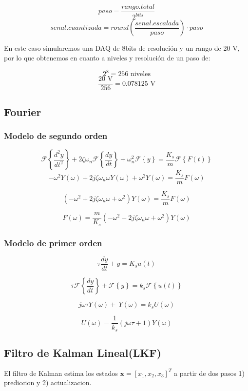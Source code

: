 \documentclass[conference]{IEEEtran}
\begin{document}
\[
paso = \frac{rango.total}{2^{bits}}
\]
\[
senal.cuantizada = round(\frac{senal.escalada}{paso})\cdot paso
\]

En este caso simularemos una DAQ de 8bits de resolución y un rango de 20 V, por lo que obtenemos en cuanto a niveles y resolución de un paso de:


\[
2^{8}=256 \text{ niveles}
\]
\[
\frac{20\text{ V}}{256}=0.078125 \text{ V}
\]

\subsection{Fourier}

\subsubsection{Modelo de segundo orden}
\[
	\mathcal{F}\left\{ \frac{d^2y}{dt^2} \right\} + 2\zeta\omega_n \mathcal{F}\left\{\frac{dy}{dt}\right\} + \omega_n^2 \mathcal{F}\left\{y\right\} = \frac{K_s}{m} \mathcal{F}\left\{F(t)\right\}
\]
\[
	-\omega^2 Y(\omega)  + 2j\zeta\omega_n\omega Y(\omega) + \omega^2 Y(\omega) = \frac{K_s}{m}F(\omega)
\]
	
\[
	\left(-\omega^2  + 2j\zeta\omega_n\omega + \omega^2 \right) Y(\omega) = \frac{K_s}{m} F(\omega)
\]

\[
	F(\omega) = \frac{m}{K_s}  \left(-\omega^2  + 2j\zeta\omega_n\omega + \omega^2 \right) Y(\omega)
\]



\subsubsection{Modelo de primer orden}

\[
	\tau \frac{dy}{dt} + y = K_s u(t)
\]

\[
	\tau \mathcal{F}\left\{\frac{dy}{dt}\right\} + \mathcal{F} \left\{y\right\} = k_s \mathcal{F} \left\{u(t) \right\}
\]

\[
	 j\omega \tau  Y(\omega) + \ Y(\omega) = k_s U(\omega)
\]

\[
	U(\omega) = \frac{1}{k_s} (j\omega \tau + 1) Y(\omega)
\]

\subsection{Filtro de Kalman Lineal(LKF)}

El filtro de Kalman estima los estados $\textbf{x} = [x_1, x_2, x_3]^T$ a partir de dos pasos 1) prediccion y 2) actualizacion.
\end{document}
